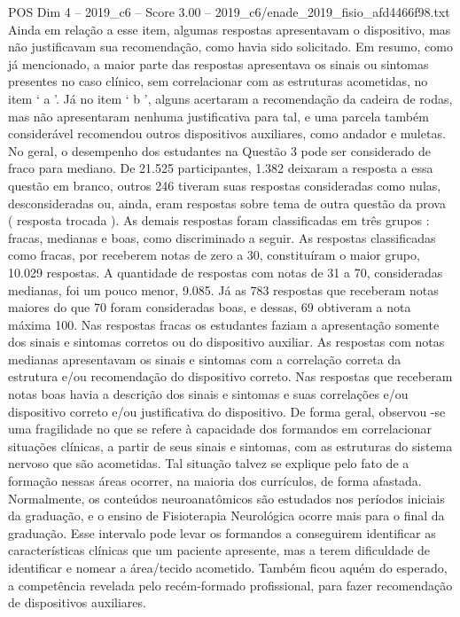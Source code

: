 \begin{textsample}{POS Dim 4 – 2019\_c6 – Score 3.00 – 2019\_c6/enade\_2019\_fisio\_afd4466f98.txt}
Ainda em relação a esse item, algumas respostas apresentavam o dispositivo, mas não justificavam sua recomendação, como havia sido solicitado.
Em resumo, como já mencionado, a maior parte das respostas apresentava os sinais ou sintomas presentes no caso clínico, sem correlacionar com as estruturas acometidas, no item ‘ a ’.
Já no item ‘ b ’, alguns acertaram a recomendação da cadeira de rodas, mas não apresentaram nenhuma justificativa para tal, e uma parcela também considerável recomendou outros dispositivos auxiliares, como andador e muletas.
No geral, o desempenho dos estudantes na Questão 3 pode ser considerado de fraco para mediano.
De 21.525 participantes, 1.382 deixaram a resposta a essa questão em branco, outros 246 tiveram suas respostas consideradas como nulas, desconsideradas ou, ainda, eram respostas sobre tema de outra questão da prova ( resposta trocada ).
As demais respostas foram classificadas em três grupos : fracas, medianas e boas, como discriminado a seguir.
As respostas classificadas como fracas, por receberem notas de zero a 30, constituíram o maior grupo, 10.029 respostas.
A quantidade de respostas com notas de 31 a 70, consideradas medianas, foi um pouco menor, 9.085.
Já as 783 respostas que receberam notas maiores do que 70 foram consideradas boas, e dessas, 69 obtiveram a nota máxima 100.
Nas respostas fracas os estudantes faziam a apresentação somente dos sinais e sintomas corretos ou do dispositivo auxiliar.
As respostas com notas medianas apresentavam os sinais e sintomas com a correlação correta da estrutura e/ou recomendação do dispositivo correto.
Nas respostas que receberam notas boas havia a descrição dos sinais e sintomas e suas correlações e/ou dispositivo correto e/ou justificativa do dispositivo.
De forma geral, observou -se uma fragilidade no que se refere à capacidade dos formandos em correlacionar situações clínicas, a partir de seus sinais e sintomas, com as estruturas do sistema nervoso que são acometidas.
Tal situação talvez se explique pelo fato de a formação nessas áreas ocorrer, na maioria dos currículos, de forma afastada.
Normalmente, os conteúdos neuroanatômicos são estudados nos períodos iniciais da graduação, e o ensino de Fisioterapia Neurológica ocorre mais para o final da graduação.
Esse intervalo pode levar os formandos a conseguirem identificar as características clínicas que um paciente apresente, mas a terem dificuldade de identificar e nomear a área/tecido acometido.
Também ficou aquém do esperado, a competência revelada pelo recém-formado profissional, para fazer recomendação de dispositivos auxiliares.

\end{textsample}
